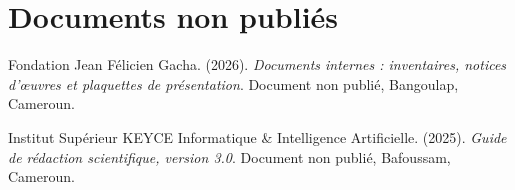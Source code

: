 \section*{Documents non publiés}

\begin{apalist}
\item Fondation Jean Félicien Gacha. (2026). \emph{Documents internes :
      inventaires, notices d'œuvres et plaquettes de présentation}. Document non
      publié, Bangoulap, Cameroun.

\item Institut Supérieur KEYCE Informatique \& Intelligence Artificielle.
      (2025). \emph{Guide de rédaction scientifique, version 3.0}. Document non
      publié, Bafoussam, Cameroun.
\end{apalist}
